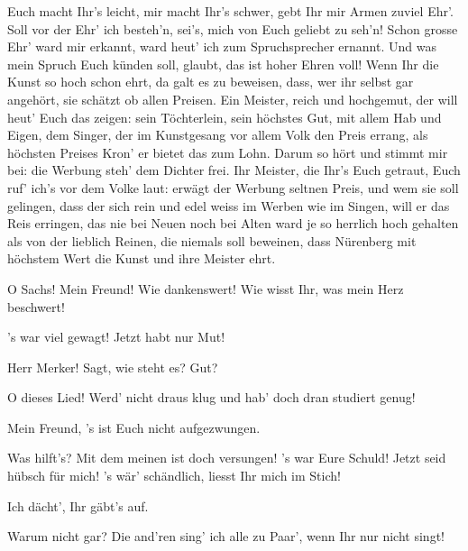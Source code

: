 \begin{drama}
\Sachsspeaks
Euch macht Ihr's leicht, mir macht Ihr's schwer,
gebt Ihr mir Armen zuviel Ehr'.
Soll vor der Ehr' ich besteh'n,
sei's, mich von Euch geliebt zu seh'n!
Schon grosse Ehr' ward mir erkannt,
ward heut' ich zum Spruchsprecher ernannt.
Und was mein Spruch Euch künden soll,
glaubt, das ist hoher Ehren voll!
Wenn Ihr die Kunst so hoch schon ehrt,
da galt es zu beweisen,
dass, wer ihr selbst gar angehört,
sie schätzt ob allen Preisen.
Ein Meister, reich und hochgemut,
der will heut' Euch das zeigen:
sein Töchterlein, sein höchstes Gut,
mit allem Hab und Eigen,
dem Singer, der im Kunstgesang
vor allem Volk den Preis errang,
als höchsten Preises Kron'
er bietet das zum Lohn.
Darum so hört und stimmt mir bei:
die Werbung steh' dem Dichter frei.
Ihr Meister, die Ihr's Euch getraut,
Euch ruf' ich's vor dem Volke laut:
erwägt der Werbung seltnen Preis,
und wem sie soll gelingen,
dass der sich rein und edel weiss
im Werben wie im Singen,
will er das Reis erringen,
das nie bei Neuen noch bei Alten
ward je so herrlich hoch gehalten
als von der lieblich Reinen,
die niemals soll beweinen,
dass Nürenberg mit höchstem Wert
die Kunst und ihre Meister ehrt.




\Pognerspeaks
O Sachs! Mein Freund! Wie dankenswert!
Wie wisst Ihr, was mein Herz beschwert!

\Sachsspeaks


's war viel gewagt! Jetzt habt nur Mut!


Herr Merker! Sagt, wie steht es? Gut?

\Beckmesserspeaks
O dieses Lied! Werd' nicht draus klug
und hab' doch dran studiert genug!

\Sachsspeaks
Mein Freund, 's ist Euch nicht aufgezwungen.

\Beckmesserspeaks
Was hilft's? Mit dem meinen ist doch versungen!
's war Eure Schuld! Jetzt seid hübsch für mich!
's wär' schändlich, liesst Ihr mich im Stich!

\Sachsspeaks
Ich dächt', Ihr gäbt's auf.

\Beckmesserspeaks
Warum nicht gar?
Die and'ren sing' ich alle zu Paar',
wenn Ihr nur nicht singt!


\end{drama}
